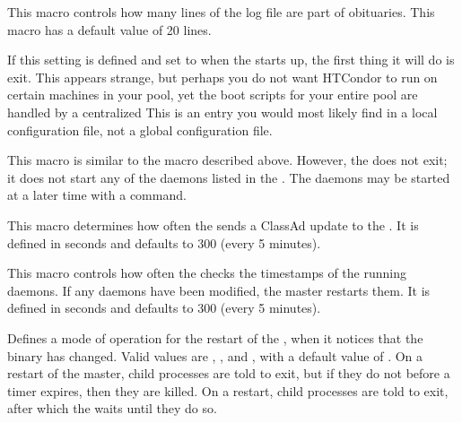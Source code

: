 \begin{description}
\label{param:ObituaryLogLength}
\item[\Macro{OBITUARY\_LOG\_LENGTH}]
  This macro controls how many lines
  of the log file are part of obituaries.  This macro has a default
  value of 20 lines.

\label{param:StartMaster}
\item[\Macro{START\_MASTER}]
  If this setting is defined and set to 
  when the  starts up, the first
  thing it will do is exit.  This appears strange, but perhaps you
  do not want HTCondor to run on certain machines in your pool, yet
  the boot scripts for your entire pool are handled by a centralized
  This is
  an entry you would most likely find in a local configuration file,
  not a global configuration file.

\label{param:StartDaemons}
\item[\Macro{START\_DAEMONS}]
  This macro
  is similar to the  macro described above.
  However, the  does not exit; it does not start any
  of the daemons listed in the .
  The daemons may be started at a later time with a 
  command.

\label{param:MasterUpdateInterval}
\item[\Macro{MASTER\_UPDATE\_INTERVAL}]
  This macro determines how often
  the  sends a ClassAd update to the
  .  It is defined in seconds and defaults to 300
  (every 5 minutes).
  
\label{param:MasterCheckNewExecInterval}
\item[\Macro{MASTER\_CHECK\_NEW\_EXEC\_INTERVAL}]
  This macro controls how often the  checks the timestamps
  of the running daemons.  If any daemons have been modified, the
  master restarts them.  It is defined in seconds and defaults to 300
  (every 5 minutes).

\label{param:MasterNewBinaryRestart}
\item[\Macro{MASTER\_NEW\_BINARY\_RESTART}]
  Defines a mode of operation for the restart of the ,
  when it notices that the  binary has changed.
  Valid values are , , and ,
  with a default value of .
  On a  restart of the master, child processes are told to exit,
  but if they do not before a timer expires, then they are killed.
  On a  restart, child processes are told to exit,
  after which the  waits until they do so.


\end{description}
